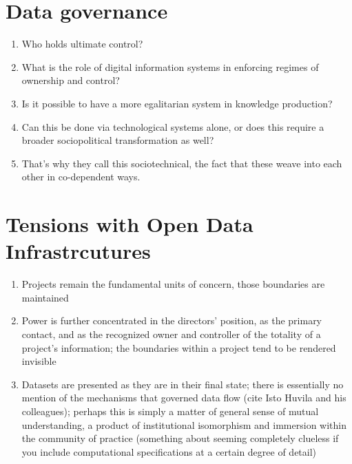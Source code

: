 \documentclass{article}
\begin{document}
\section{Data governance}
\begin{enumerate}
  \item Who holds ultimate control?
  \item What is the role of digital information systems in enforcing regimes of ownership and control?
  \item Is it possible to have a more egalitarian system in knowledge production?
  \item Can this be done via technological systems alone, or does this require a broader sociopolitical transformation as well?
  \item That's why they call this sociotechnical, the fact that these weave into each other in co-dependent ways.
\end{enumerate}

\section{Tensions with Open Data Infrastrcutures}
\begin{enumerate}
  \item Projects remain the fundamental units of concern, those boundaries are maintained
  \item Power is further concentrated in the directors' position, as the primary contact, and as the recognized owner and controller of the totality of a project's information; the boundaries within a project tend to be rendered invisible
  \item Datasets are presented as they are in their final state; there is essentially no mention of the mechanisms that governed data flow (cite Isto Huvila and his colleagues); perhaps this is simply a matter of general sense of mutual understanding, a product of institutional isomorphism and immersion within the community of practice (something about seeming completely clueless if you include computational specifications at a certain degree of detail)
\end{enumerate}
\end{document}
